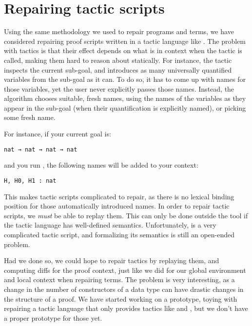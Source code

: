 \section{Repairing tactic scripts}

Using the same methodology we used to repair programs and terms, we have
considered repairing proof scripts written in a tactic language like \Ltac{}.
The problem with \Coq{} tactics is that their effect depends on what is in
context when the tactic is called, making them hard to reason about statically.
For instance, the  tactic inspects the current sub-goal, and
introduces as many universally quantified variables from the sub-goal as it can.
To do so, it has to come up with names for those variables, yet the user never
explicitly passes those names.  Instead, the algorithm chooses suitable, fresh
names, using the names of the variables as they appear in the sub-goal (when
their quantification is explicitly named), or picking some fresh name.

For instance, if your current goal is:

\begin{verbatim}
nat → nat → nat → nat
\end{verbatim}

\noindent%
%
and you run , the following names will be added to your
context:

\begin{verbatim}
H, H0, H1 : nat
\end{verbatim}

\noindent%
%
This makes tactic scripts complicated to repair, as there is no lexical binding
position for those automatically introduced names.  In order to repair tactic
scripts, we \emph{must} be able to replay them.  This can only be done outside
the tool if the tactic language has well-defined semantics.  Unfortunately,
\Ltac{} is a very complicated tactic script, and formalizing its semantics is
still an open-ended problem.

Had we done so, we could hope to repair tactics by replaying them, and computing
diffs for the proof context, just like we did for our global environment and
local context when repairing terms.  The problem is very interesting, as a
change in the number of constructors of a data type can have drastic changes in
the structure of a proof.  We have started working on a prototype, toying with
repairing a tactic language that only provides tactics like 
and , but we don't have a proper prototype for those yet.
